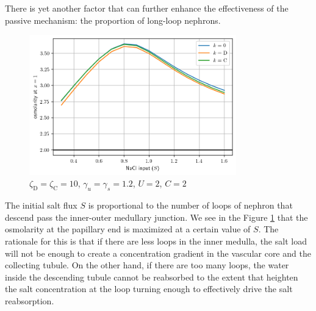 \documentclass{article}
\numberwithin{equation}{section} %
\begin{document}
There is yet another factor that can further enhance the effectiveness of the passive mechanism: the proportion of long-loop nephrons.
\begin{figure}
    \centering
    \includegraphics[width=0.8\textwidth]{../results/7-20-2023/osm_loop_fraction.png}
    \caption{$\zeta_\mathrm{D} = \zeta_\mathrm{C} = 10$, $\gamma_u = \gamma_s = 1.2$, $U = 2$, $C = 2$}
    \label{fig:loop_frac}
\end{figure}
The initial salt flux $S$ is proportional to the number of loops of nephron that descend pass the inner-outer medullary junction.
We see in the Figure \ref{fig:loop_frac} that the osmolarity at the papillary end is maximized at a certain value of $S$.
The rationale for this is that if there are less loops in the inner medulla, the salt load will not be enough to create a concentration gradient in the vascular core and the collecting tubule.
On the other hand, if there are too many loops, the water inside the descending tubule cannot be reabsorbed to the extent that heighten the salt concentration at the loop turning enough to effectively drive the salt reabsorption.
\end{document}
